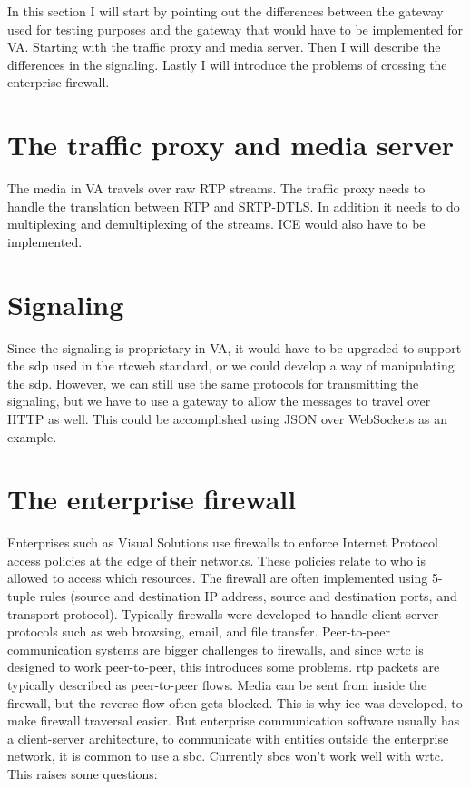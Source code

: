 
In this section I will start by pointing out the differences between the gateway used for testing purposes and the gateway that would have to be implemented for VA. Starting with the traffic proxy and media server. Then I will describe the differences in the signaling. Lastly I will introduce the problems of crossing the enterprise firewall.

\section{The traffic proxy and media server}
The media in VA travels over raw RTP streams. The traffic proxy needs to handle the translation between RTP and SRTP-DTLS. In addition it needs to do multiplexing and demultiplexing of the streams. ICE would also have to be implemented.

\section{Signaling}
Since the signaling is proprietary in VA, it would have to be upgraded to support the \gls{sdp} used in the \gls{rtcweb} standard, or we could develop a way of manipulating the \gls{sdp}. However, we can still use the same protocols for transmitting the signaling, but we have to use a gateway to allow the messages to travel over HTTP as well. This could be accomplished using JSON over WebSockets as an example.

\section{The enterprise firewall}
Enterprises such as Visual Solutions use firewalls to enforce Internet Protocol access policies at the edge of their networks. These policies relate to who is allowed to access which resources. The firewall are often implemented using 5-tuple rules (source and destination IP address, source and destination ports, and transport protocol). Typically firewalls were developed to handle client-server protocols such as web browsing, email, and file transfer\cite{johnston_taking_2013}. Peer-to-peer communication systems are bigger challenges to firewalls, and since \gls{wrtc} is designed to work peer-to-peer, this introduces some problems. \gls{rtp} packets are typically described as peer-to-peer flows. Media can be sent from inside the firewall, but the reverse flow often gets blocked. This is why \gls{ice} was developed, to make firewall traversal easier. But enterprise communication software usually has a client-server architecture, to communicate with entities outside the enterprise network, it is common to use a \gls{sbc}. Currently \gls{sbc}s won't work well with \gls{wrtc}. This raises some questions:

